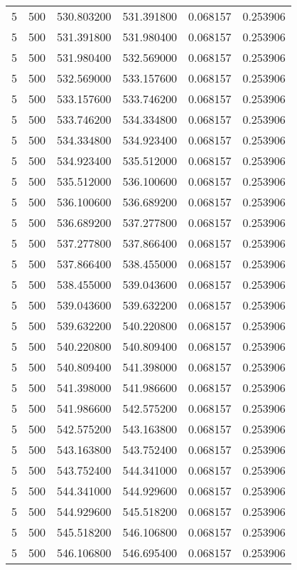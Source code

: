 \begin{longtable}{rrrrrr}
5 & 500 & 530.803200 & 531.391800 & 0.068157 & 0.253906 \\
5 & 500 & 531.391800 & 531.980400 & 0.068157 & 0.253906 \\
5 & 500 & 531.980400 & 532.569000 & 0.068157 & 0.253906 \\
5 & 500 & 532.569000 & 533.157600 & 0.068157 & 0.253906 \\
5 & 500 & 533.157600 & 533.746200 & 0.068157 & 0.253906 \\
5 & 500 & 533.746200 & 534.334800 & 0.068157 & 0.253906 \\
5 & 500 & 534.334800 & 534.923400 & 0.068157 & 0.253906 \\
5 & 500 & 534.923400 & 535.512000 & 0.068157 & 0.253906 \\
5 & 500 & 535.512000 & 536.100600 & 0.068157 & 0.253906 \\
5 & 500 & 536.100600 & 536.689200 & 0.068157 & 0.253906 \\
5 & 500 & 536.689200 & 537.277800 & 0.068157 & 0.253906 \\
5 & 500 & 537.277800 & 537.866400 & 0.068157 & 0.253906 \\
5 & 500 & 537.866400 & 538.455000 & 0.068157 & 0.253906 \\
5 & 500 & 538.455000 & 539.043600 & 0.068157 & 0.253906 \\
5 & 500 & 539.043600 & 539.632200 & 0.068157 & 0.253906 \\
5 & 500 & 539.632200 & 540.220800 & 0.068157 & 0.253906 \\
5 & 500 & 540.220800 & 540.809400 & 0.068157 & 0.253906 \\
5 & 500 & 540.809400 & 541.398000 & 0.068157 & 0.253906 \\
5 & 500 & 541.398000 & 541.986600 & 0.068157 & 0.253906 \\
5 & 500 & 541.986600 & 542.575200 & 0.068157 & 0.253906 \\
5 & 500 & 542.575200 & 543.163800 & 0.068157 & 0.253906 \\
5 & 500 & 543.163800 & 543.752400 & 0.068157 & 0.253906 \\
5 & 500 & 543.752400 & 544.341000 & 0.068157 & 0.253906 \\
5 & 500 & 544.341000 & 544.929600 & 0.068157 & 0.253906 \\
5 & 500 & 544.929600 & 545.518200 & 0.068157 & 0.253906 \\
5 & 500 & 545.518200 & 546.106800 & 0.068157 & 0.253906 \\
5 & 500 & 546.106800 & 546.695400 & 0.068157 & 0.253906 \\

\end{longtable}
